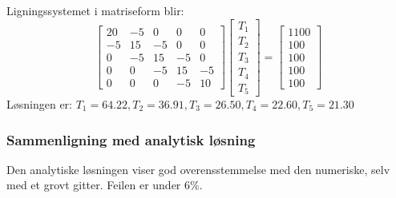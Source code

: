 Ligningssystemet i matriseform blir:
\[
\begin{bmatrix}
20 & -5 & 0 & 0&0 \\
-5 & 15 & -5 & 0 & 0 \\
0& -5& 15 & -5 & 0\\
0&0&-5& 15 &-5 \\
0&0&0&-5&10
\end{bmatrix}
\begin{bmatrix} T_1 \\ T_2 \\ T_3 \\ T_4 \\ T_5 \end{bmatrix} = \begin{bmatrix} 
1100\\ 100 \\ 100 \\ 100 \\ 100\end{bmatrix}
\]
Løsningen er:
$
T_1 = 64.22, T_2 = 36.91, T_3 = 26.50, T_4 = 22.60, T_5 = 21.30
$

\subsubsection*{Sammenligning med analytisk løsning}

Den analytiske løsningen viser god overensstemmelse med den numeriske, selv med et grovt gitter. Feilen er under 6\%.


